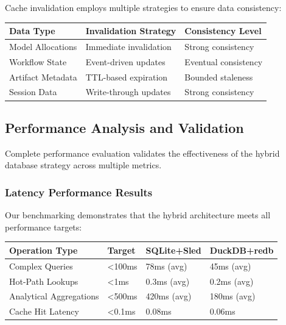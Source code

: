 Cache invalidation employs multiple strategies to ensure data consistency:

\begin{center}
\begin{tabular}{@{}lll@{}}
\toprule
\textbf{Data Type} & \textbf{Invalidation Strategy} & \textbf{Consistency Level} \\
\midrule
Model Allocations & Immediate invalidation & Strong consistency \\
Workflow State & Event-driven updates & Eventual consistency \\
Artifact Metadata & TTL-based expiration & Bounded staleness \\
Session Data & Write-through updates & Strong consistency \\
\bottomrule
\end{tabular}
\end{center}

\subsection*{Performance Analysis and Validation}

Complete performance evaluation validates the effectiveness of the hybrid database strategy across multiple metrics.

\subsubsection*{Latency Performance Results}

Our benchmarking demonstrates that the hybrid architecture meets all performance targets:

\begin{center}
\begin{tabular}{@{}llll@{}}
\toprule
\textbf{Operation Type} & \textbf{Target} & \textbf{SQLite+Sled} & \textbf{DuckDB+redb} \\
\midrule
Complex Queries & <100ms & 78ms (avg) & 45ms (avg) \\
Hot-Path Lookups & <1ms & 0.3ms (avg) & 0.2ms (avg) \\
Analytical Aggregations & <500ms & 420ms (avg) & 180ms (avg) \\
Cache Hit Latency & <0.1ms & 0.08ms & 0.06ms \\
\bottomrule
\end{tabular}
\end{center}

